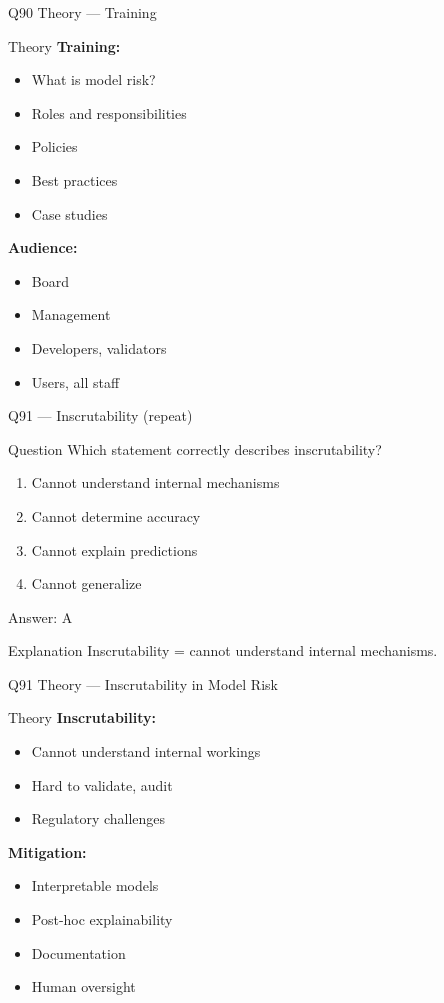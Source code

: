 \documentclass[aspectratio=169,8pt]{beamer}
\begin{document}
	\begin{frame}{Q90 Theory --- Training}
		\begin{block}{Theory}
			\textbf{Training:}
			\begin{itemize}
				\item What is model risk?
				\item Roles and responsibilities
				\item Policies
				\item Best practices
				\item Case studies
			\end{itemize}
			\textbf{Audience:}
			\begin{itemize}
				\item Board
				\item Management
				\item Developers, validators
				\item Users, all staff
			\end{itemize}
		\end{block}
	\end{frame}
	
	\begin{frame}{Q91 --- Inscrutability (repeat)}
		\begin{block}{Question}
			Which statement correctly describes inscrutability?
		\end{block}
		\begin{enumerate}[label=\Alph*.]
			\item Cannot understand internal mechanisms
			\item Cannot determine accuracy
			\item Cannot explain predictions
			\item Cannot generalize
		\end{enumerate}
		\begin{exampleblock}{Answer: A}
		\end{exampleblock}
		\begin{block}{Explanation}
			Inscrutability = cannot understand internal mechanisms.
		\end{block}
	\end{frame}
	
	\begin{frame}{Q91 Theory --- Inscrutability in Model Risk}
		\begin{block}{Theory}
			\textbf{Inscrutability:}
			\begin{itemize}
				\item Cannot understand internal workings
				\item Hard to validate, audit
				\item Regulatory challenges
			\end{itemize}
			\textbf{Mitigation:}
			\begin{itemize}
				\item Interpretable models
				\item Post-hoc explainability
				\item Documentation
				\item Human oversight
			\end{itemize}
		\end{block}
	\end{frame}
	
\end{document}
